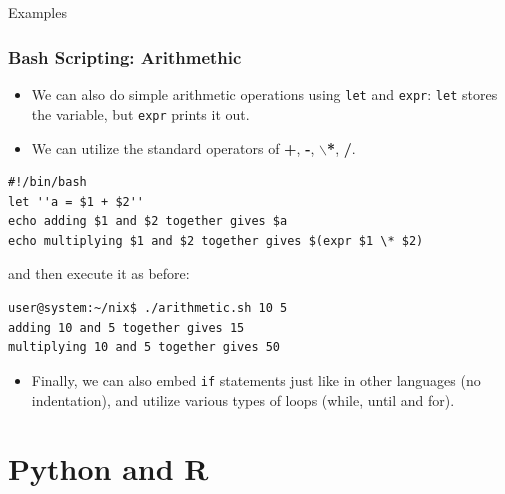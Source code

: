 \documentclass[10pt]{beamer}
\begin{document}
\subsection{}
\begin{frame}[fragile]{Examples}
\frametitle{Bash Scripting: Arithmethic}
\begin{itemize}
\item We can also do simple arithmetic operations using \texttt{let} and \texttt{expr}: \texttt{let} stores the variable, but \texttt{expr} prints it out.\vspace{0.05in}
\item We can utilize the standard operators of \textbf{+}, \textbf{-}, \textbf{$\backslash$*},\textbf{ /}.\vspace{0.05in}
\end{itemize}
\begin{lstlisting}[style=BashInputStyle]
#!/bin/bash
let ''a = $1 + $2''
echo adding $1 and $2 together gives $a
echo multiplying $1 and $2 together gives $(expr $1 \* $2)
\end{lstlisting}\vspace{0.1in}
\quad and then execute it as before:\vspace{0.1in}
\begin{lstlisting}[style=BashInputStyle]
user@system:~/nix$ ./arithmetic.sh 10 5
adding 10 and 5 together gives 15
multiplying 10 and 5 together gives 50
\end{lstlisting}\vspace{0.05in}
\begin{itemize}
\item Finally, we can also embed \texttt{if} statements just like in other languages (no indentation), and utilize various types of loops (while, until and for).\vspace{0.05in}
\end{itemize}
\end{frame}

\section{Python and R}
\end{document}
